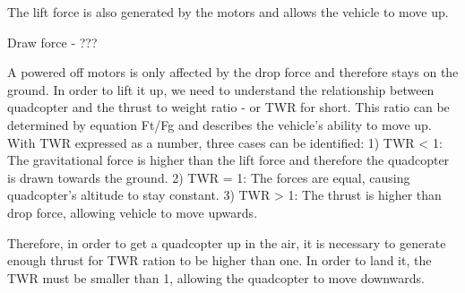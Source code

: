 The lift force is also generated by the motors and allows the vehicle to move up.

Draw force - ???

A powered off motors is only affected by the drop force and therefore stays on the ground. In order to lift it up, we need to understand the relationship between quadcopter and the thrust to weight ratio - or TWR for short. This ratio can be determined by equation Ft/Fg and describes the vehicle's ability to move up. With TWR expressed as a number, three cases can be identified:
1) TWR < 1: The gravitational force is higher than the lift force and therefore the quadcopter is drawn towards the ground.
2) TWR = 1: The forces are equal, causing quadcopter's altitude to stay constant.
3) TWR > 1: The thrust is higher than drop force, allowing vehicle to move upwards.

Therefore, in order to get a quadcopter up in the air, it is necessary to generate enough thrust for TWR ration to be higher than one. In order to land it, the TWR must be smaller than 1, allowing the quadcopter to move downwards.



